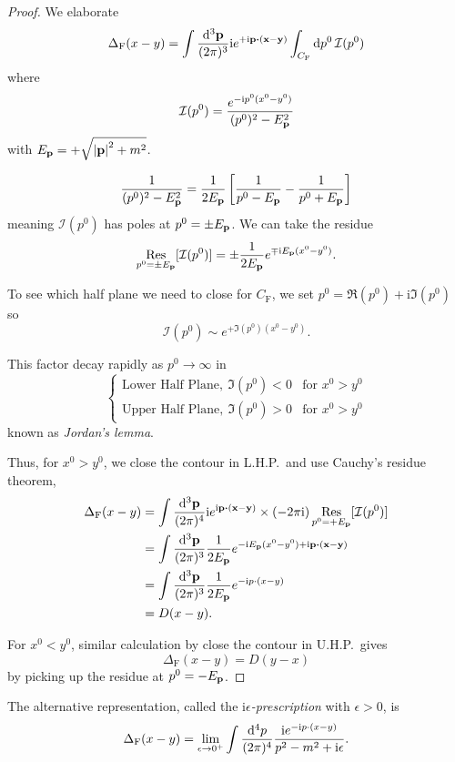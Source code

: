 \documentclass[a4paper,11pt]{article}
\begin{document}
	\begin{proof}
		We elaborate 
		\[
			\Delta_\text{F}(x-y) = \int \ddk{\vb p}{3} \mathrm{i} e ^{+ \mathrm{i} \vb p \vdot (\vb x - \vb y)} \int _{C_\text{F}} \dd{p^0} \mathcal{I}(p^0)
		\]
		where
		\[
			\mathcal{I}(p^0) = \frac{e ^{- \mathrm{i} p^0 (x^0 - y^0)}}{(p^0)^2 - E _{\vb p}^2}
		\]
		with $E _{\vb p} = + \sqrt{\abs{\vb p}^2 + m^2}$.
	
		\[
			\frac{1}{(p^0)^2 - E _{\vb p}^2} = \frac{1}{2 E _{\vb p}}\left[ \frac{1}{p^0 - E _{\vb p}} - \frac{1}{p^0 + E _{\vb p}} \right]
		\]
		meaning $\mathcal{I}(p^0)$ has poles at $p^0 = \pm E _{\vb p}$. We can take the residue
		\[
			\operatorname*{Res} _{p^0 = \pm E _{\vb p}} [\mathcal{I}(p^0)] = \pm \frac{1}{2 E _{\vb p}} e ^{\mp \mathrm{i} E _{\vb p} (x^0 - y^0)}.
		\]

		To see which half plane we need to close for $C_\text{F}$, we set $p^0 = \Re(p^0) + \mathrm{i}\Im(p^0)$ so
		\[
			\mathcal{I}(p^0) \sim e ^{+ \Im (p^0) (x^0 - y^0)}.
		\]
		
		This factor decay rapidly as $p^0 \to \infty$ in 
		\[
			\begin{cases}
				\text{Lower Half Plane},\ \Im(p^0)<0 & \text{for } x^0 > y^0\\
				\text{Upper Half Plane},\ \Im(p^0)>0 & \text{for } x^0 > y^0
			\end{cases}
		\]
		known as \emph{Jordan's lemma}.
		
		Thus, for $x^0 > y^0$, we close the contour in L.H.P.\ and use Cauchy's residue theorem, 
		\begin{align*}
			\Delta_\text{F} (x-y) & = \int \frac{\dd[3]{\vb p}}{(2 \pi)^4} \mathrm{i} e ^{\mathrm{i} \vb p \vdot (\vb x - \vb y)} \times (- 2 \pi \mathrm{i}) \dRes _{p^0 = + E _{\vb p}} [\mathcal{I}(p^0)]\\
			& = \int \ddk{\vb p}{3} \frac{1}{2 E _{\vb p}} e ^{- \mathrm{i} E _{\vb p}(x^0 - y^0) + \mathrm{i} \vb p \vdot (\vb x - \vb y)}\\
			& = \int \ddk{\vb p}{3} \frac{1}{2 E _{\vb p}} e ^{- \mathrm{i} p \cdot (x-y)}\\
			& = D(x-y).
		\end{align*}
		
		For $x^0 < y^0$, similar calculation by close the contour in U.H.P.\ gives
		\[
			\Delta_\text{F}(x-y) = D(y - x)
		\]
		by picking up the residue at $p^0 = - E _{\vb p}$. 
	\end{proof}

	The alternative representation, called the \emph{$\mathrm{i} \epsilon$-prescription} with $\epsilon > 0$, is
	\[
		\Delta_\text{F}(x-y) = \lim _{\epsilon \to 0^+} \int \frac{\dd[4]{p}}{(2\pi)^{4}} \frac{\mathrm{i} e ^{- \mathrm{i} p \cdot (x-y)}}{p^2 - m^2 + \mathrm{i} \epsilon}.
	\]
	
\end{document}
